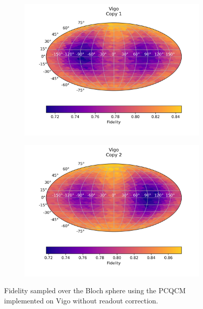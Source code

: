   
  \begin{figure}[H]
    \centering
    \begin{subfigure}{.5\textwidth}
      \centering
      \includegraphics[width=\textwidth]{Figures/PhaseCovariant/IBM/FullSphere/results_vigo_copy1.png}
      
      \label{fig:pc_uncorrected_vigo_sphere_1}
    \end{subfigure}%
    \begin{subfigure}{.5\textwidth}
      \centering
      \includegraphics[width=\textwidth]{Figures/PhaseCovariant/IBM/FullSphere/results_vigo_copy2.png}
      
      \label{fig:pc_uncorrected_vigo_sphere_2}
    \end{subfigure}
    \caption{Fidelity sampled over the Bloch sphere using the PCQCM implemented on Vigo without readout correction.}
    \label{fig:pc_uncorrected_vigo_sphere}
  \end{figure}
  
